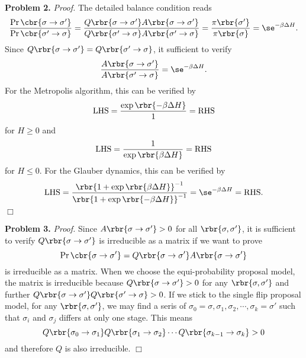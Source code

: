 \documentclass[english, nochinese]{pnote}
\DeclareMathOperator\oppr{\mathrm{Pr}}
\begin{document}
\textbf{Problem 2.} \textit{Proof.} The detailed balance condition reads
\begin{equation}
\frac{ \oppr \cbr{ \sigma \rightarrow \sigma' } }{ \oppr \cbr{ \sigma' \rightarrow \sigma } } = \frac{ Q \rbr{ \sigma \rightarrow \sigma' } A \rbr{ \sigma \rightarrow \sigma' } }{ Q \rbr{ \sigma' \rightarrow \sigma } A \rbr{ \sigma' \rightarrow \sigma } } = \frac{ \pi \rbr{\sigma'} }{ \pi \rbr{\sigma} } = \se^{ -\beta \Delta H }.
\end{equation}
Since $ Q \rbr{ \sigma \rightarrow \sigma' } = Q \rbr{ \sigma' \rightarrow \sigma } $, it sufficient to verify
\begin{equation}
\frac{ A \rbr{ \sigma \rightarrow \sigma' } }{ A \rbr{ \sigma' \rightarrow \sigma } } = \se^{ -\beta \Delta H }.
\end{equation}
For the Metropolis algorithm, this can be verified by
\begin{equation}
\text{LHS} = \frac{\exp \rbr{ -\beta \Delta H }}{1} = \text{RHS}
\end{equation}
for $ H \ge 0 $ and
\begin{equation}
\text{LHS} = \frac{1}{\exp \rbr{ \beta \Delta H }} = \text{RHS}
\end{equation}
for $ H \le 0 $. For the Glauber dynamics, this can be verified by
\begin{equation}
\text{LHS} = \frac{\rbr{ 1 + \exp \rbr{ \beta \Delta H } }^{-1}}{\rbr{ 1 + \exp \rbr{ -\beta \Delta H } }^{-1}} = \se^{ -\beta \Delta H } = \text{RHS}.
\end{equation}
\hfill$\Box$

\textbf{Problem 3.} \textit{Proof.} Since $ A \rbr{ \sigma \rightarrow \sigma' } > 0 $ for all $ \rbr{ \sigma, \sigma' } $, it is sufficient to verify $ Q \rbr{ \sigma \rightarrow \sigma' } $ is irreducible as a matrix if we want to prove
\begin{equation}
\oppr \cbr{ \sigma \rightarrow \sigma' } = Q \rbr{ \sigma \rightarrow \sigma' } A \rbr{ \sigma \rightarrow \sigma' }
\end{equation}
is irreducible as a matrix. When we choose the equi-probability proposal model, the matrix is irreducible because $ Q \rbr{ \sigma \rightarrow \sigma' } > 0 $ for any $ \rbr{ \sigma, \sigma' } $ and further $ Q \rbr{ \sigma \rightarrow \sigma' } Q \rbr{ \sigma' \rightarrow \sigma } > 0 $. If we stick to the single flip proposal model, for any $ \rbr{ \sigma, \sigma' } $, we may find a seris of $ \sigma_0 = \sigma, \sigma_1, \sigma_2, \cdots, \sigma_k = \sigma' $ such that $\sigma_i$ and $\sigma_j$ differs at only one stage. This means
\begin{equation}
Q \rbr{ \sigma_0 \rightarrow \sigma_1 } Q \rbr{ \sigma_1 \rightarrow \sigma_2 } \cdots Q \rbr{ \sigma_{ k - 1 } \rightarrow \sigma_k } > 0
\end{equation}
and therefore $Q$ is also irreducible.
\hfill$\Box$
\end{document}
